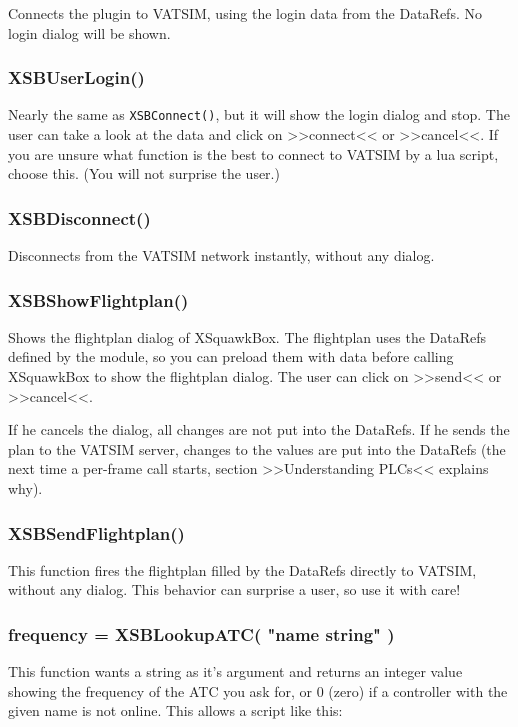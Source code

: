 \documentclass[11pt,parskip=half,a4paper]{scrartcl}
\begin{document}
Connects the plugin to VATSIM, using the login data from the DataRefs. No login dialog will be shown.

\subsubsection{XSBUserLogin()}

Nearly the same as \verb|XSBConnect()|, but it will show the login dialog and stop. The user can take a look at the data and click on >>connect<< or >>cancel<<. If you are unsure what function is the best to connect to VATSIM by a lua script, choose this. (You will not surprise the user.)

\subsubsection{XSBDisconnect()}

Disconnects from the VATSIM network instantly, without any dialog.

\subsubsection{XSBShowFlightplan()}

Shows the flightplan dialog of XSquawkBox. The flightplan uses the DataRefs defined by the module, so you can preload them with data before calling XSquawkBox to show the flightplan dialog. The user can click on >>send<< or >>cancel<<.

If he cancels the dialog, all changes are not put into the DataRefs. If he sends the plan to the VATSIM server, changes to the values are put into the DataRefs (the next time a per-frame call starts, section >>Understanding PLCs<< explains why).

\subsubsection{XSBSendFlightplan()}

This function fires the flightplan filled by the DataRefs directly to VATSIM, without any dialog. This behavior can surprise a user, so use it with care!

\subsubsection{frequency = XSBLookupATC( "name string" )}

This function wants a string as it's argument and returns an integer value showing the frequency of the ATC you ask for, or 0 (zero) if a controller with the given name is not online. This allows a script like this:
\end{document}
